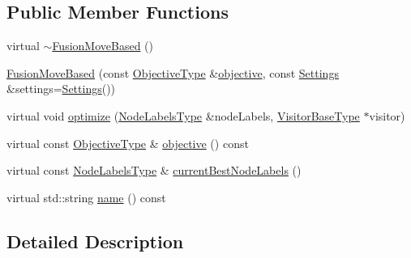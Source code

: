 \subsection*{Public Member Functions}
\begin{DoxyCompactItemize}
\item 
virtual \hyperlink{classnifty_1_1graph_1_1lifted__multicut_1_1FusionMoveBased_ab7684f4a88d24faeb14def96ecbb535d}{$\sim$\+Fusion\+Move\+Based} ()
\item 
\hyperlink{classnifty_1_1graph_1_1lifted__multicut_1_1FusionMoveBased_ae1f51f69e9237078509e4f83f0da0832}{Fusion\+Move\+Based} (const \hyperlink{classnifty_1_1graph_1_1lifted__multicut_1_1FusionMoveBased_a1522076835fbbde715134a8902dc4dae}{Objective\+Type} \&\hyperlink{classnifty_1_1graph_1_1lifted__multicut_1_1FusionMoveBased_a28d59bfced1c1c9d7b4eadc3eab89418}{objective}, const \hyperlink{structnifty_1_1graph_1_1lifted__multicut_1_1FusionMoveBased_1_1Settings}{Settings} \&settings=\hyperlink{structnifty_1_1graph_1_1lifted__multicut_1_1FusionMoveBased_1_1Settings}{Settings}())
\item 
virtual void \hyperlink{classnifty_1_1graph_1_1lifted__multicut_1_1FusionMoveBased_a6ea0f4b83865ee8782a0116c8de3a423}{optimize} (\hyperlink{classnifty_1_1graph_1_1lifted__multicut_1_1FusionMoveBased_a8f102c8a683a95e96d2897a1357dd379}{Node\+Labels\+Type} \&node\+Labels, \hyperlink{classnifty_1_1graph_1_1lifted__multicut_1_1FusionMoveBased_a75f55fc3177f6bf8e070df7007bfbb5c}{Visitor\+Base\+Type} $\ast$visitor)
\item 
virtual const \hyperlink{classnifty_1_1graph_1_1lifted__multicut_1_1FusionMoveBased_a1522076835fbbde715134a8902dc4dae}{Objective\+Type} \& \hyperlink{classnifty_1_1graph_1_1lifted__multicut_1_1FusionMoveBased_a28d59bfced1c1c9d7b4eadc3eab89418}{objective} () const 
\item 
virtual const \hyperlink{classnifty_1_1graph_1_1lifted__multicut_1_1FusionMoveBased_a8f102c8a683a95e96d2897a1357dd379}{Node\+Labels\+Type} \& \hyperlink{classnifty_1_1graph_1_1lifted__multicut_1_1FusionMoveBased_a47aa9129b1831148d356e892f0593b8f}{current\+Best\+Node\+Labels} ()
\item 
virtual std\+::string \hyperlink{classnifty_1_1graph_1_1lifted__multicut_1_1FusionMoveBased_ae1d1a4029d7bbfe2e71f58eecb866f52}{name} () const 
\end{DoxyCompactItemize}


\subsection{Detailed Description}
